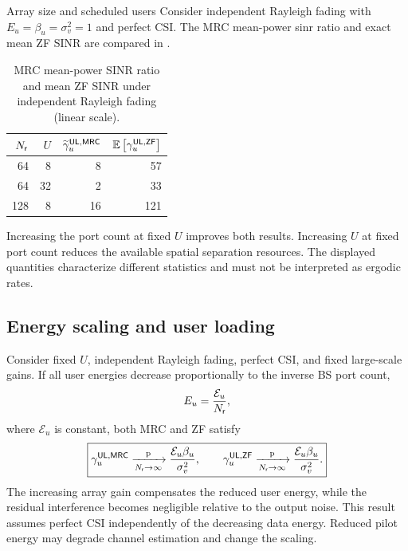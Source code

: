 \begin{example}{Array size and scheduled users}
	Consider independent Rayleigh fading with $E_u=\beta_u=\sigma_v^2=1$ and perfect CSI. The MRC mean-power \ac{sinr} ratio and exact mean ZF SINR are compared in .
	\begin{table}[htbp]
		\centering
		\caption{MRC mean-power SINR ratio and mean ZF SINR
			under independent Rayleigh fading (linear scale).}
		\label{tab:scaling-05}
		\begin{tabular}{rrrr}
			\toprule
			$N_{\mathsf{r}}$ & $U$ &
			$\widetilde\gamma_u^{\mathsf{UL},\mathsf{MRC}}$ &
			$\mathbb{E}\left[\gamma_u^{\mathsf{UL},\mathsf{ZF}}\right]$\\
			\midrule
			64  & 8  & 8  & 57\\
			64  & 32 & 2  & 33\\
			128 & 8  & 16 & 121\\
			\bottomrule
		\end{tabular}
	\end{table}
	Increasing the port count at fixed $U$ improves both results. Increasing $U$ at fixed port count reduces the available spatial separation resources. The displayed quantities characterize different statistics and must not be interpreted as ergodic rates.
\end{example}

\subsection{Energy scaling and user loading}
Consider fixed $U$, independent Rayleigh fading, perfect CSI, and fixed large-scale gains. If all user energies decrease proportionally to the inverse BS port count,
\begin{equation*}
	E_u=\frac{\mathcal E_u}{N_{\mathsf{r}}},
\end{equation*}
where $\mathcal E_u$ is constant, both MRC and ZF satisfy
\begin{equation}
	\boxed{
		\gamma_u^{\mathsf{UL},\mathsf{MRC}}
		\xrightarrow[N_{\mathsf{r}}\to\infty]{\mathrm p}
		\frac{\mathcal E_u\beta_u}{\sigma_v^2},
		\qquad
		\gamma_u^{\mathsf{UL},\mathsf{ZF}}
		\xrightarrow[N_{\mathsf{r}}\to\infty]{\mathrm p}
		\frac{\mathcal E_u\beta_u}{\sigma_v^2}.
	}
	\label{eq:energyscale-05}
\end{equation}
The increasing array gain compensates the reduced user energy, while the residual interference becomes negligible relative to the output noise. This result assumes perfect CSI independently of the decreasing data energy. Reduced pilot energy may degrade channel estimation and change the scaling.

